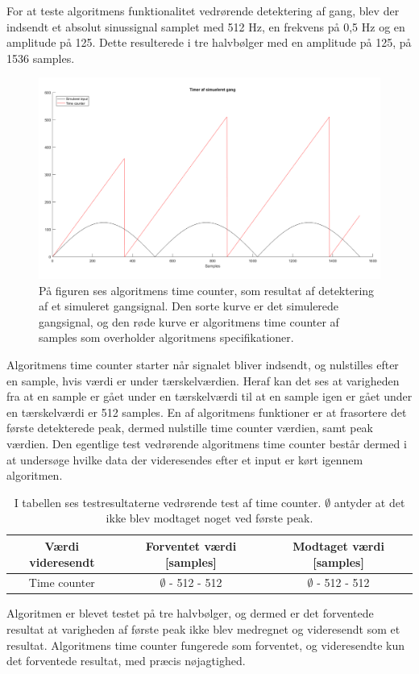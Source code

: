For at teste algoritmens funktionalitet vedrørende detektering af gang, blev der indsendt et absolut sinussignal samplet med 512 Hz, en frekvens på 0,5 Hz og en amplitude på 125. Dette resulterede i tre halvbølger med en amplitude på 125, på 1536 samples. 
\begin{figure}[H]
	\centering
	\includegraphics[scale=0.3]{figures/cDesign/test_timecount_gang.png}
	\caption{På figuren ses algoritmens time counter, som resultat af detektering af et simuleret gangsignal. Den sorte kurve er det simulerede gangsignal, og den røde kurve er algoritmens time counter af samples som overholder algoritmens specifikationer.}
	\label{fig:testgraf_timecounter}
\end{figure}
Algoritmens time counter starter når signalet bliver indsendt, og nulstilles efter en sample, hvis værdi er under tærskelværdien. Heraf kan det ses at varigheden fra at en sample er gået under en tærskelværdi til at en sample igen er gået under en tærskelværdi er 512 samples. En af algoritmens funktioner er at frasortere det første detekterede peak, dermed nulstille time counter værdien, samt peak værdien. Den egentlige test vedrørende algoritmens time counter består dermed i at undersøge hvilke data der videresendes efter et input er kørt igennem algoritmen.
\begin{table}[H]
	\centering
	\begin{tabular}{ccc}
		\hline
		\rowcolor[HTML]{C0C0C0} 
		Værdi videresendt & Forventet værdi [samples] & Modtaget værdi [samples] \\ \hline
		Time counter & $\emptyset$ - 512 - 512 & $\emptyset$ - 512 - 512 \\ \hline
	\end{tabular}
	\caption{I tabellen ses testresultaterne vedrørende test af time counter. $\emptyset$ antyder at det ikke blev modtaget noget ved første peak.}
	\label{tab:test_res_timecount}
\end{table} \vspace{-0.5cm}
Algoritmen er blevet testet på tre halvbølger, og dermed er det forventede resultat at varigheden af første peak ikke blev medregnet og videresendt som et resultat. Algoritmens time counter fungerede som forventet, og videresendte kun det forventede resultat, med præcis nøjagtighed.

